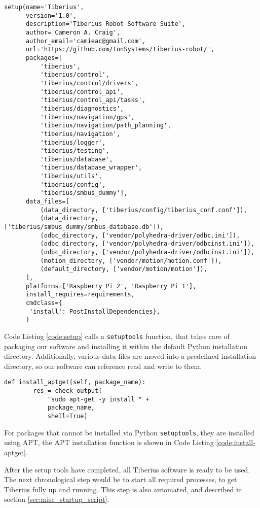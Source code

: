 \begin{lstlisting}[style=custompython,label=code:setup,caption=Python setuptools function call]
setup(name='Tiberius',
      version='1.0',
      description='Tiberius Robot Software Suite',
      author='Cameron A. Craig',
      author_email='camieac@gmail.com',
      url='https://github.com/IonSystems/tiberius-robot/',
      packages=[
          'tiberius',
          'tiberius/control',
          'tiberius/control/drivers',
          'tiberius/control_api',
          'tiberius/control_api/tasks',
          'tiberius/diagnostics',
          'tiberius/navigation/gps',
          'tiberius/navigation/path_planning',
          'tiberius/navigation',
          'tiberius/logger',
          'tiberius/testing',
          'tiberius/database',
          'tiberius/database_wrapper',
          'tiberius/utils',
          'tiberius/config',
          'tiberius/smbus_dummy'],
      data_files=[
          (data_directory, ['tiberius/config/tiberius_conf.conf']),
          (data_directory, ['tiberius/smbus_dummy/smbus_database.db']),
          (odbc_directory, ['vendor/polyhedra-driver/odbc.ini']),
          (odbc_directory, ['vendor/polyhedra-driver/odbcinst.ini']),
          (odbc_directory, ['vendor/polyhedra-driver/odbcinst.ini']),
          (motion_directory, ['vendor/motion/motion.conf']),
          (default_directory, ['vendor/motion/motion']),
      ],
      platforms=['Raspberry Pi 2', 'Raspberry Pi 1'],
      install_requires=requirements,
      cmdclass={
       'install': PostInstallDependencies},
      )
\end{lstlisting}

Code Listing \ref{code:setup} calls a \texttt{setuptools} function, that takes care of packaging our software and installing it within the default Python installation directory. Additionally, various data files are moved into a predefined installation directory, so our software can reference read and write to them.

\begin{lstlisting}[style=custompython,label=code:install-aptget,caption=Advanced packaging tool install function]
def install_aptget(self, package_name):
        res = check_output(
            "sudo apt-get -y install " +
            package_name,
            shell=True)
\end{lstlisting}

For packages that cannot be installed via Python \texttt{setuptools}, they are installed using \gls{APT}, the \gls{APT} installation function is shown in Code Listing \ref{code:install-aptget}.

After the setup tools have completed, all Tiberius software is ready to be used. The next chronological step would be to start all required processes, to get Tiberius fully up and running. This step is also automated, and described in section \ref{sec:misc_startup_script}.

